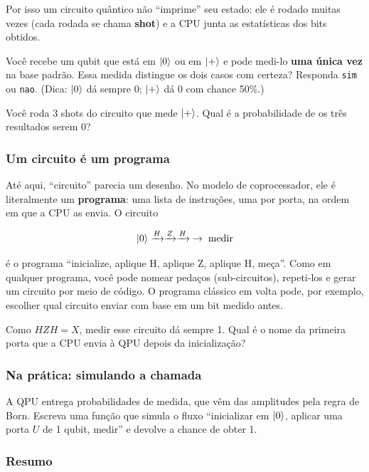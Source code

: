 Por isso um circuito quântico não ``imprime'' seu estado: ele é rodado muitas vezes (cada rodada se chama \textbf{shot}) e a CPU junta as estatísticas dos bits obtidos.

Você recebe um qubit que está em \(\left|{0}\right>\) ou em \(\left|{+}\right>\) e pode medi-lo \textbf{uma única vez} na base padrão. Essa medida distingue os dois casos com certeza? Responda \texttt{sim} ou \texttt{nao}. (Dica: \(\left|{0}\right>\) dá sempre 0; \(\left|{+}\right>\) dá 0 com chance 50\%.)

Você roda 3 shots do circuito que mede \(\left|{+}\right>\). Qual é a probabilidade de os três resultados serem 0?

\subsubsection{Um circuito é um programa}\label{um-circuito-uxe9-um-programa}

Até aqui, ``circuito'' parecia um desenho. No modelo de coprocessador, ele é literalmente um \textbf{programa}: uma lista de instruções, uma por porta, na ordem em que a CPU as envia. O circuito

\[
\left|{0}\right> \xrightarrow{H} \xrightarrow{Z} \xrightarrow{H} \;\to\; \text{medir}
\]

é o programa ``inicialize, aplique H, aplique Z, aplique H, meça''. Como em qualquer programa, você pode nomear pedaços (sub-circuitos), repeti-los e gerar um circuito por meio de código. O programa clássico em volta pode, por exemplo, escolher qual circuito enviar com base em um bit medido antes.

Como \(HZH = X\), medir esse circuito dá sempre 1. Qual é o nome da primeira porta que a CPU envia à QPU depois da inicialização?

\subsubsection{Na prática: simulando a chamada}\label{na-pruxe1tica-simulando-a-chamada}

A QPU entrega probabilidades de medida, que vêm das amplitudes pela regra de Born. Escreva uma função que simula o fluxo ``inicializar em \(\left|{0}\right>\), aplicar uma porta \(U\) de 1 qubit, medir'' e devolve a chance de obter 1.

\subsubsection{Resumo}\label{resumo}

